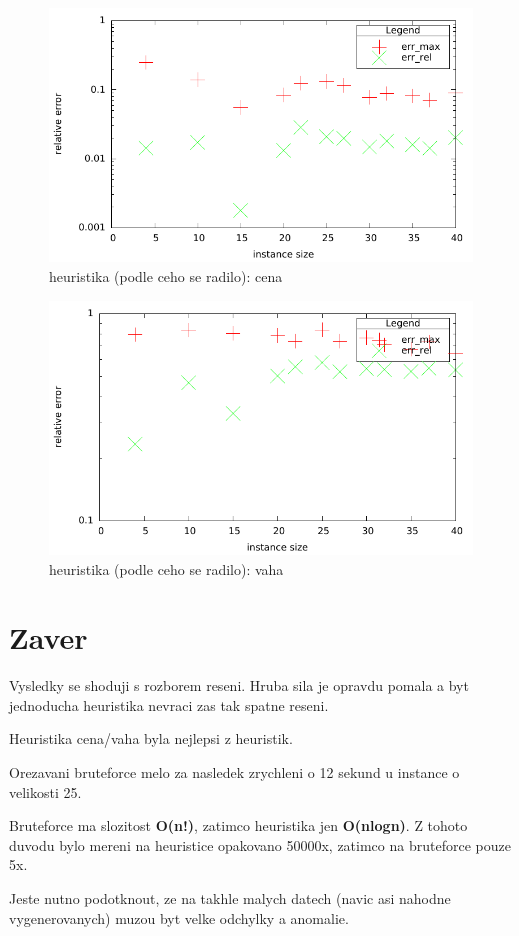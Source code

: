 \documentclass[12pt,a4paper]{article}
\begin{document}
\begin{figure}[H]
	\caption{heuristika (podle ceho se radilo): cena}
	\includegraphics{./err_h2.pdf}
\end{figure}

\begin{figure}[H]
	\caption{heuristika (podle ceho se radilo): vaha}
	\includegraphics{./err_h3.pdf}
\end{figure}


\section{Zaver}
Vysledky se shoduji s rozborem reseni. Hruba sila je opravdu pomala a byt jednoducha heuristika nevraci zas tak spatne reseni.

Heuristika cena/vaha byla nejlepsi z heuristik.

Orezavani bruteforce melo za nasledek zrychleni o 12 sekund u instance o velikosti 25.

Bruteforce ma slozitost \textbf{O(n!)}, zatimco heuristika jen \textbf{O(nlogn)}. Z tohoto duvodu bylo mereni na heuristice opakovano 50000x, zatimco na bruteforce pouze 5x.

Jeste nutno podotknout, ze na takhle malych datech (navic asi nahodne vygenerovanych) muzou byt velke odchylky a anomalie.
\end{document}

